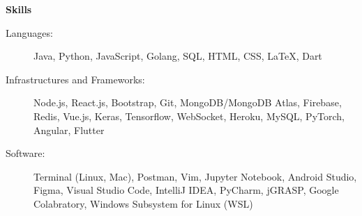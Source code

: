 \documentclass[letterpaper,10pt]{article}
\newcommand{\resitem}[1]{\item #1 \vspace{-2pt}}
\newcommand{\resheading}[1]{{\large \colorbox{mygrey}{\begin{minipage}{\textwidth}{\textbf{#1 \vphantom{p\^{E}}}}\end{minipage}}}}
\begin{document}
\begin{itemize}
\begin{itemize}
	\end{itemize}
	
\end{itemize}

\resheading{Skills}

\begin{description}
\item[Languages:] Java, Python, JavaScript, Golang, SQL, HTML, CSS, LaTeX, Dart %
\item[Infrastructures and Frameworks:] Node.js, React.js, Bootstrap, Git, MongoDB/MongoDB Atlas, Firebase, Redis, Vue.js, Keras, Tensorflow, WebSocket, Heroku, MySQL, PyTorch, Angular, Flutter
\item[Software:] Terminal (Linux, Mac), Postman, Vim, Jupyter Notebook, Android Studio, Figma, Visual Studio Code, IntelliJ IDEA, PyCharm, jGRASP, Google Colabratory, Windows Subsystem for Linux (WSL)
\end{description}
\end{document}
